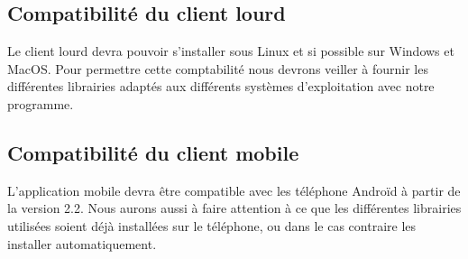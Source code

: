 \subsection{Compatibilité du client lourd}
Le client lourd devra pouvoir s'installer sous Linux et si possible sur Windows et MacOS. 
Pour permettre cette comptabilité nous devrons veiller à fournir les différentes librairies adaptés aux différents systèmes d'exploitation avec notre programme. 

\subsection{Compatibilité du client mobile}
L'application mobile devra être compatible avec les téléphone Androïd à partir de la version 2.2. 
Nous aurons aussi à faire attention à ce que les différentes librairies utilisées soient déjà installées sur le téléphone, ou dans le cas contraire les installer automatiquement.

